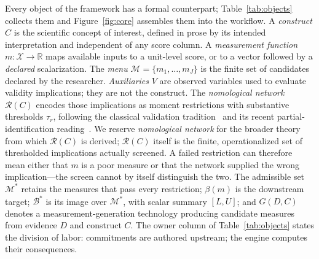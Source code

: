 \documentclass[10pt,letterpaper]{article}
\newcommand{\M}{\ensuremath{\mathcal{M}}}
\newcommand{\Rset}{\mathcal{R}}
\newcommand{\Bset}{\mathcal{B}}
\begin{document}
Every object of the framework has a formal counterpart; Table~\ref{tab:objects} collects them and Figure~\ref{fig:core} assembles them into the workflow.
A \emph{construct} $C$ is the scientific concept of interest, defined in prose by its intended interpretation and independent of any score column.
A \emph{measurement function} $m:\mathcal{X}\to\mathbb{R}$ maps available inputs to a unit-level score, or to a vector followed by a \emph{declared} scalarization.
The \emph{menu} $\M=\{m_1,\ldots,m_J\}$ is the finite set of candidates declared by the researcher.
\emph{Auxiliaries} $V$ are observed variables used to evaluate validity implications; they are not the construct.
The \emph{nomological network} $\Rset(C)$ encodes those implications as moment restrictions with substantive thresholds $\tau_r$, following the classical validation tradition~\cite{cronbach1955,campbell1959} and its recent partial-identification reading~\cite{dellrambachan2026}.
We reserve \emph{nomological network} for the broader theory from which $\Rset(C)$ is derived; $\Rset(C)$ itself is the finite, operationalized set of thresholded implications actually screened.
A failed restriction can therefore mean either that $m$ is a poor measure or that the network supplied the wrong implication---the screen cannot by itself distinguish the two.
The admissible set $\M^*$ retains the measures that pass every restriction; $\beta(m)$ is the downstream target; $\Bset^*$ is its image over $\M^*$, with scalar summary $[L,U]$; and $G(D,C)$ denotes a measurement-generation technology producing candidate measures from evidence $D$ and construct $C$.
The owner column of Table~\ref{tab:objects} states the division of labor: commitments are authored upstream; the engine computes their consequences.
\end{document}
